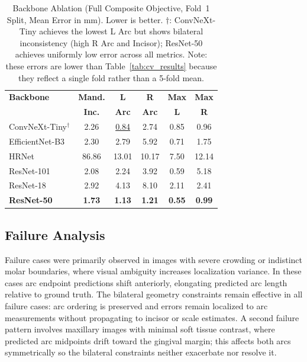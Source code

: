 \documentclass[conference]{IEEEtran}
\begin{document}
\begin{table}[htbp]
\caption{Backbone Ablation (Full Composite Objective, Fold~1 Split, Mean Error in mm). Lower
is better. $\dagger$: ConvNeXt-Tiny achieves the lowest L Arc but shows bilateral
inconsistency (high R Arc and Incisor); ResNet-50 achieves uniformly low error across all
metrics. Note: these errors are lower than Table~\ref{tab:cv_results} because they reflect a
single fold rather than a 5-fold mean.}
\begin{center}
\begin{tabular}{|l|c|c|c|c|c|}
\hline
\textbf{Backbone} & \textbf{Mand.} & \textbf{L} & \textbf{R} & \textbf{Max} & \textbf{Max} \\
 & \textbf{Inc.} & \textbf{Arc} & \textbf{Arc} & \textbf{L} & \textbf{R} \\
\hline
ConvNeXt-Tiny$^\dagger$ & 2.26 & \underline{0.84} & 2.74 & 0.85 & 0.96 \\
EfficientNet-B3         & 2.30 & 2.79 & 5.92 & 0.71 & 1.75 \\
HRNet                   & 86.86 & 13.01 & 10.17 & 7.50 & 12.14 \\
ResNet-101              & 2.08 & 2.24 & 3.92 & 0.59 & 5.18 \\
ResNet-18               & 2.92 & 4.13 & 8.10 & 2.11 & 2.41 \\
\textbf{ResNet-50}      & \textbf{1.73} & \textbf{1.13} & \textbf{1.21} & \textbf{0.55} & \textbf{0.99} \\
\hline
\end{tabular}
\label{tab:backbone_results}
\end{center}
\end{table}

\subsection{Failure Analysis}

Failure cases were primarily observed in images with severe crowding or indistinct molar
boundaries, where visual ambiguity increases localization variance. In these cases arc
endpoint predictions shift anteriorly, elongating predicted arc length relative to ground
truth. The bilateral geometry constraints remain effective in all failure cases: arc ordering
is preserved and errors remain localized to arc measurements without propagating to incisor
or scale estimates. A second failure pattern involves maxillary images with minimal soft
tissue contrast, where predicted arc midpoints drift toward the gingival margin; this affects
both arcs symmetrically so the bilateral constraints neither exacerbate nor resolve it.
\end{document}
